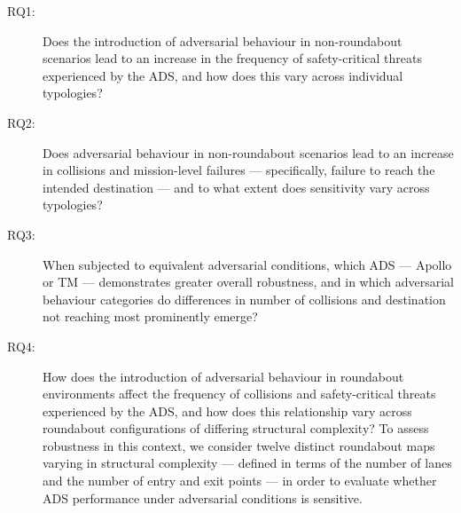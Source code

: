 \documentclass[sigconf,review,anonymous]{acmart}
\begin{document}
\begin{description}
\item[RQ1:] Does the introduction of adversarial behaviour in non-roundabout scenarios lead to an increase in the frequency of safety-critical threats experienced by the ADS, and how does this vary across individual typologies?
\item[RQ2:]Does adversarial behaviour in non-roundabout scenarios lead to an increase in collisions and mission-level failures — specifically, failure to reach the intended destination — and to what extent does sensitivity vary across typologies?


\item[RQ3:] When subjected to equivalent adversarial conditions, which ADS — Apollo or TM — demonstrates greater overall robustness, and in which adversarial behaviour categories do differences in number of collisions and destination not reaching most prominently emerge?
\item[RQ4:] How does the introduction of adversarial behaviour in roundabout environments affect the frequency of collisions and safety-critical threats experienced by the ADS, and how does this relationship vary across roundabout configurations of differing structural complexity?
To assess robustness in this context, we consider twelve distinct roundabout maps varying in structural complexity — defined in terms of the number of lanes and the number of entry and exit points — in order to evaluate whether ADS performance under adversarial conditions is sensitive. %
\end{description}
\end{document}
